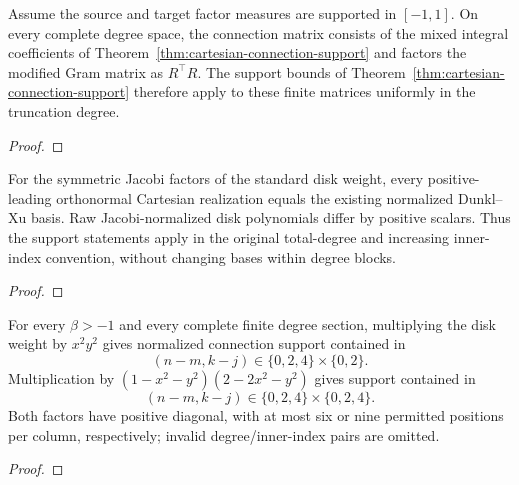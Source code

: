 \begin{theorem}
\label{thm:cartesian-gram-factors}
\leanok
Assume the source and target factor measures are supported in $[-1,1]$.
On every complete degree space, the connection matrix consists of the mixed integral coefficients of Theorem~\ref{thm:cartesian-connection-support} and factors the modified Gram matrix as $R^\top R$.
The support bounds of Theorem~\ref{thm:cartesian-connection-support} therefore apply to these finite
matrices uniformly in the truncation degree.
\end{theorem}
\begin{proof}
\leanok
\end{proof}

\begin{theorem}
\label{thm:dunkl-xu-cartesian-normalization}
\leanok
For the symmetric Jacobi factors of the standard disk weight, every
positive-leading orthonormal Cartesian realization equals the existing normalized
Dunkl--Xu basis. Raw Jacobi-normalized disk polynomials differ by positive scalars.
Thus the support statements apply in the original total-degree and increasing
inner-index convention, without changing bases within degree blocks.
\end{theorem}
\begin{proof}
\leanok
\end{proof}

\begin{theorem}
\label{thm:disk-six-nine-support}
\leanok
For every $\beta>-1$ and every complete finite degree section, multiplying the
disk weight by $x^2y^2$ gives normalized connection support contained in
\[
 (n-m,k-j)\in\{0,2,4\}\times\{0,2\}.
\]
Multiplication by $(1-x^2-y^2)(2-2x^2-y^2)$ gives support contained in
\[
 (n-m,k-j)\in\{0,2,4\}\times\{0,2,4\}.
\]
Both factors have positive diagonal, with at most six or nine permitted positions
per column, respectively; invalid degree/inner-index pairs are omitted.
\end{theorem}
\begin{proof}
\leanok
\end{proof}

